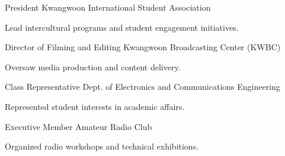 \documentclass[11pt, letterpaper]{awesome-cv}
\begin{document}

\begin{cvhonors}
\end{cvhonors}

\begin{cvhonors}
\end{cvhonors}

\begin{cventries}
  \cventry
    {President}
    {Kwangwoon International Student Association}
    {}
    {}
    {
      \begin{cvitems}
        \item {Lead intercultural programs and student engagement initiatives.}
      \end{cvitems}
    }
  \cventry
    {Director of Filming and Editing}
    {Kwangwoon Broadcasting Center (KWBC)}
    {}
    {}
    {
      \begin{cvitems}
        \item {Oversaw media production and content delivery.}
      \end{cvitems}
    }
  \cventry
    {Class Representative}
    {Dept. of Electronics and Communications Engineering}
    {}
    {}
    {
      \begin{cvitems}
        \item {Represented student interests in academic affairs.}
      \end{cvitems}
    }
  \cventry
    {Executive Member}
    {Amateur Radio Club}
    {}
    {}
    {
      \begin{cvitems}
        \item {Organized radio workshops and technical exhibitions.}
      \end{cvitems}
    }
\end{cventries}
\end{document}
